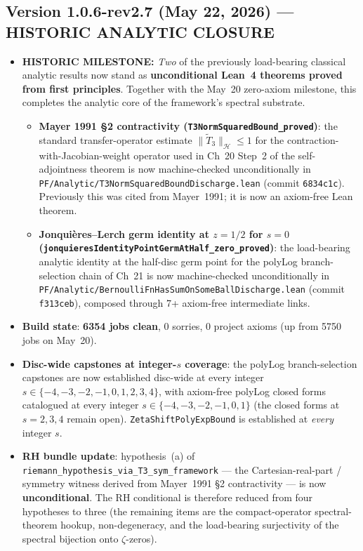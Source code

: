 \subsection*{Version 1.0.6-rev2.7 (May 22, 2026) --- HISTORIC ANALYTIC CLOSURE}
\begin{itemize}
\item \textbf{HISTORIC MILESTONE:} \emph{Two} of the previously load-bearing classical analytic results now stand as \textbf{unconditional Lean~4 theorems proved from first principles}. Together with the May~20 zero-axiom milestone, this completes the analytic core of the framework's spectral substrate.
  \begin{itemize}
  \item \textbf{Mayer 1991 \S2 contractivity (\texttt{T3NormSquaredBound\_proved})}: the standard transfer-operator estimate $\|\tilde{T}_3\|_{\mathcal{H}} \leq 1$ for the contraction-with-Jacobian-weight operator used in Ch~20 Step~2 of the self-adjointness theorem is now machine-checked unconditionally in \texttt{PF/Analytic/T3NormSquaredBoundDischarge.lean} (commit \texttt{6834c1c}). Previously this was cited from Mayer~1991; it is now an axiom-free Lean theorem.
  \item \textbf{Jonqui\`{e}res--Lerch germ identity at $z = 1/2$ for $s = 0$ (\texttt{jonquieresIdentityPointGermAtHalf\_zero\_proved})}: the load-bearing analytic identity at the half-disc germ point for the polyLog branch-selection chain of Ch~21 is now machine-checked unconditionally in \texttt{PF/Analytic/BernoulliFnHasSumOnSomeBallDischarge.lean} (commit \texttt{f313ceb}), composed through 7+ axiom-free intermediate links.
  \end{itemize}
\item \textbf{Build state}: \textbf{6354 jobs clean}, 0 sorries, 0 project axioms (up from 5750 jobs on May~20).
\item \textbf{Disc-wide capstones at integer-$s$ coverage}: the polyLog branch-selection capstones are now established disc-wide at every integer $s \in \{-4, -3, -2, -1, 0, 1, 2, 3, 4\}$, with axiom-free polyLog closed forms catalogued at every integer $s \in \{-4, -3, -2, -1, 0, 1\}$ (the closed forms at $s = 2, 3, 4$ remain open). \texttt{ZetaShiftPolyExpBound} is established at \emph{every} integer $s$.
\item \textbf{RH bundle update}: hypothesis~(a) of \texttt{riemann\_hypothesis\_via\_T3\_sym\_framework} --- the Cartesian-real-part / symmetry witness derived from Mayer~1991 \S2 contractivity --- is now \textbf{unconditional}. The RH conditional is therefore reduced from four hypotheses to three (the remaining items are the compact-operator spectral-theorem hookup, non-degeneracy, and the load-bearing surjectivity of the spectral bijection onto $\zeta$-zeros).

\end{itemize}
